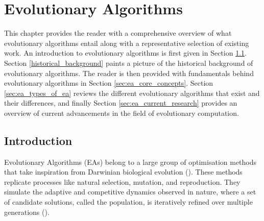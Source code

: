 \chapter{Evolutionary Algorithms}\label{chapter_ea}

\noindent This chapter provides the reader with a comprehensive overview of what evolutionary algorithms entail along with a representative selection of existing work. An introduction to evolutionary algorithms is first given in Section \ref{ea_introduction}. Section \ref{historical_background} paints a picture of the historical background of evolutionary algorithms. The reader is then provided with fundamentals behind evolutionary algorithms in Section \ref{sec:ea_core_concepts}. Section \ref{sec:ea_types_of_ea} reviews the different evolutionary algorithms that exist and their differences, and finally Section \ref{sec:ea_current_research} provides an overview of current advancements in the field of evolutionary computation.

\section{Introduction}\label{ea_introduction}
Evolutionary Algorithms (EAs) belong to a large group of optimisation methods that take inspiration from Darwinian biological evolution (\cite{book_introduction_to_evolutionary_computing}). These methods replicate processes like natural selection, mutation, and reproduction. They simulate the adaptive and competitive dynamics observed in nature, where a set of candidate solutions, called the population, is iteratively refined over multiple generations (\cite{basicsOfEvolutionaryComputing}). \bigskip


